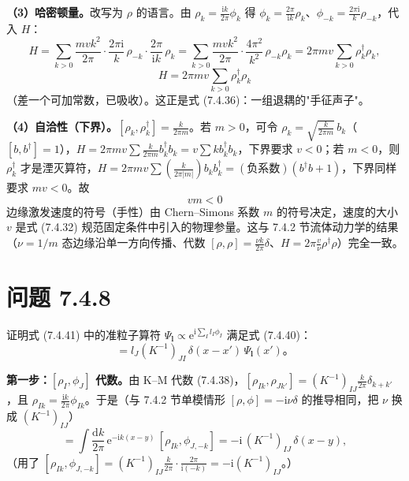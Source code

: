 \textbf{（3）哈密顿量。}改写为 $\rho$ 的语言。由 $\rho_k=\frac{\mathrm{i}k}{2\pi}\phi_k$ 得 $\phi_k=\frac{2\pi}{\mathrm{i}k}\rho_k$、$\phi_{-k}=\frac{2\pi\mathrm{i}}{k}\rho_{-k}$，代入 $H$：
\begin{equation*}
H=\sum_{k>0}\frac{mvk^2}{2\pi}\cdot\frac{2\pi\mathrm{i}}{k}\,\rho_{-k}\cdot\frac{2\pi}{\mathrm{i}k}\,\rho_k
=\sum_{k>0}\frac{mvk^2}{2\pi}\cdot\frac{4\pi^2}{k^2}\,\rho_{-k}\rho_k
=2\pi mv\sum_{k>0}\rho_k^{\dagger}\rho_k ,
\end{equation*}
\begin{equation*}
\boxed{\;H=2\pi mv\sum_{k>0}\rho_k^{\dagger}\rho_k\;}
\end{equation*}
（差一个可加常数，已吸收）。这正是式 (7.4.36)：一组退耦的"手征声子"。

\textbf{（4）自洽性（下界）。}$[\rho_k,\rho_k^{\dagger}]=\frac{k}{2\pi m}$。若 $m>0$，可令 $\rho_k=\sqrt{\frac{k}{2\pi m}}\,b_k$（$[b,b^{\dagger}]=1$），$H=2\pi mv\sum\frac{k}{2\pi m}b_k^{\dagger}b_k=v\sum kb_k^{\dagger}b_k$，下界要求 $v<0$；若 $m<0$，则 $\rho_k^{\dagger}$ 才是湮灭算符，$H=2\pi mv\sum(\frac{k}{2\pi|m|})b_kb_k^{\dagger}=(\text{负系数})(b^{\dagger}b+1)$，下界同样要求 $mv<0$。故
\begin{equation*}
\boxed{\;vm<0\;}
\end{equation*}
边缘激发速度的符号（手性）由 Chern--Simons 系数 $m$ 的符号决定，速度的大小 $v$ 是式 (7.4.32) 规范固定条件中引入的物理参量。这与 7.4.2 节流体动力学的结果（$\nu=1/m$ 态边缘沿单一方向传播、代数 $[\rho,\rho]=\frac{\nu k}{2\pi}\delta$、$H=2\pi\frac{v}{\nu}\rho^{\dagger}\rho$）完全一致。

\section*{问题 7.4.8}
\begin{problem}
证明式 (7.4.41) 中的准粒子算符 $\Psi_{\pmb{l}}\propto\mathrm{e}^{\mathrm{i}\sum_Il_I\phi_I}$ 满足式 (7.4.40)：
\begin{equation*}
[\rho_I(x),\Psi_{\pmb{l}}(x')]=l_J(K^{-1})_{JI}\,\delta(x-x')\,\Psi_{\pmb{l}}(x')。
\end{equation*}
\end{problem}
\solution
\textbf{第一步：$[\rho_I,\phi_J]$ 代数。}由 K--M 代数 (7.4.38)，$[\rho_{Ik},\rho_{Jk'}]=(K^{-1})_{IJ}\frac{k}{2\pi}\delta_{k+k'}$，且 $\rho_{Ik}=\frac{\mathrm{i}k}{2\pi}\phi_{Ik}$。于是（与 7.4.2 节单模情形 $[\rho,\phi]=-\mathrm{i}\nu\delta$ 的推导相同，把 $\nu$ 换成 $(K^{-1})_{IJ}$）
\begin{equation*}
[\rho_I(x),\phi_J(y)]
=\int\frac{\mathrm{d}k}{2\pi}\,\mathrm{e}^{-\mathrm{i}k(x-y)}\,[\rho_{Ik},\phi_{J,-k}]
=-\mathrm{i}\,(K^{-1})_{IJ}\,\delta(x-y),
\end{equation*}
（用了 $[\rho_{Ik},\phi_{J,-k}]=(K^{-1})_{IJ}\frac{k}{2\pi}\cdot\frac{2\pi}{\mathrm{i}(-k)}=-\mathrm{i}(K^{-1})_{IJ}$。）

